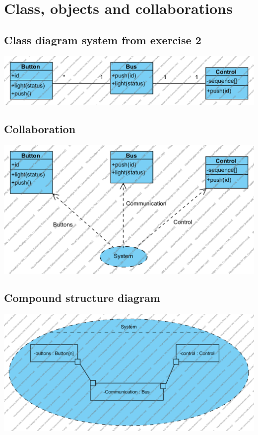 \documentclass{article}
\begin{document}
\section{Class, objects and collaborations}

\subsection{Class diagram system from exercise 2}

\includegraphics[width=\linewidth]{../class1}

\subsection{Collaboration}


  \includegraphics[width=\linewidth]{../class2}

\subsection{Compound structure diagram}

  
  \includegraphics[width=\linewidth]{../comp1}
\end{document}
